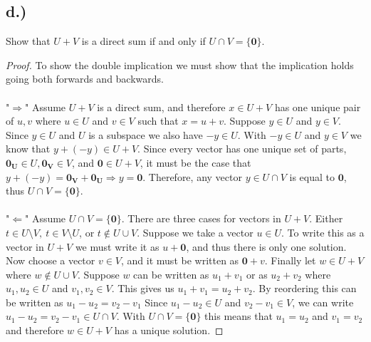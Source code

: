 \documentclass{article}
\begin{document}
	\subsection*{d.)}
		Show that $U + V$ is a direct sum if and only if $U \cap V = \{\mathbf{0} \}$.
		\begin{proof}
			To show the double implication we must show that the implication holds going both forwards and backwards.\\\\
			"$\Rightarrow$" Assume $U + V$ is a direct sum, and therefore $x \in U + V$ has one unique pair of $u,v$ where $u \in U$ and $v \in V$ such that $x = u +v$.
			Suppose $y \in U$ and $y \in V$.
			Since $y \in U$ and $U$ is a subspace we also have $-y \in U$.
			With $-y \in U$ and $y \in V$ we know that $y + (-y) \in U + V$.
			Since every vector has one unique set of parts, $\mathbf{0_U} \in U, \mathbf{0_V} \in V$, and $\mathbf{0} \in U + V$, it must be the case that $y + (-y) = \mathbf{0_V} + \mathbf{0_U} \Rightarrow y = \mathbf{0}$.
			Therefore, any vector $y \in U \cap V$ is equal to $\mathbf{0}$, thus $U \cap V = \{ \mathbf{0} \}$. \\\\
			"$\Leftarrow$" Assume $U \cap V = \{\mathbf{0}\}$.
			There are three cases for vectors in $U + V$.
			Either $t \in U \setminus V, \ t \in V \setminus U$, or $t \notin U \cup V$.
			Suppose we take a vector $u \in U$.
			To write this as a vector in $U + V$ we must write it as $u + \mathbf{0}$, and thus there is only one solution.
			Now choose a vector $v \in V$, and it must be written as $\mathbf{0} + v$.
			Finally let $w \in U + V$ where $w \notin U \cup V$.
			Suppose $w$ can be written as $u_1 + v_1$ or as $u_2 + v_2$ where $u_1, u_2 \in U$ and $v_1, v_2 \in V$.
			This gives us $u_1 + v_1 = u_2 + v_2$. By reordering this can be written as $u_1 - u_2 = v_2 - v_1$
			Since $u_1 - u_2 \in U$ and $v_2 - v_1 \in V$, we can write $u_1 - u_2 = v_2 - v_1 \in U \cap V$.
			With $U \cap V = \{ \mathbf{0} \}$ this means that $u_1 = u_2$ and $v_1 = v_2$ and therefore $w \in U + V$ has a unique solution.
		\end{proof}

	
\end{document}
